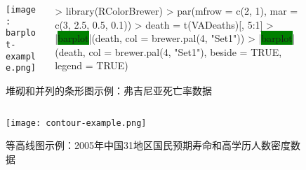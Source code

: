 \begin{frame}[c,fragile]{\subsecname}{}
\begin{figure}
 \begin{columns}
    \begin{column}[c]{.5\textwidth}
        \texttt{[image: barplot-example.png]}
    \end{column}

    \begin{column}[c]{.5\textwidth}
\begin{rcode}
> library(RColorBrewer)
> par(mfrow = c(2, 1), mar = c(3, 2.5, 0.5, 0.1))
> death = t(VADeaths)[, 5:1]
> |\colorbox{green}{barplot}|(death, col = brewer.pal(4, "Set1"))
> |\colorbox{green}{barplot}|(death, col = brewer.pal(4, "Set1"), beside = TRUE, legend = TRUE)
\end{rcode}
    \end{column}
  \end{columns}
  \caption{堆砌和并列的条形图示例：弗吉尼亚死亡率数据}
\end{figure}
\end{frame}

\begin{frame}[c,fragile]{\subsecname}{}
\begin{figure}
 \begin{columns}
    \begin{column}[c]{.5\textwidth}
        \texttt{[image: contour-example.png]}
    \end{column}

    \begin{column}[c]{.5\textwidth}
    \end{column}
  \end{columns}
  \caption{等高线图示例：2005年中国31地区国民预期寿命和高学历人数密度数据}
\end{figure}
\end{frame}

